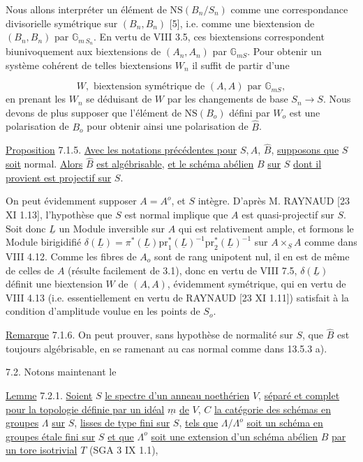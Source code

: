 Nous allons interpréter un élément de $\mathrm{NS}(B_n/S_n)$ comme une correspondance divisorielle symétrique sur $(B_n,B_n)$ [5], i.e. comme une biextension de $(B_n,B_n)$ par $\mathbb{G}_{m\,S_n}$. En vertu de VIII 3.5, ces biextensions correspondent biunivoquement aux biextensions de $(A_n,A_n)$ par $\mathbb{G}_{mS}$. Pour obtenir un système cohérent de telles biextensions $W_n$ il suffit de partir d'une

\begin{equation}\tag{7.1.4}
W, \text{ biextension symétrique de } (A,A) \text{ par } \mathbb{G}_{mS} ,
\end{equation}
en prenant les $W_n$ se déduisant de $W$ par les changements de base $S_n \longrightarrow S$. Nous devons de plus supposer que l'élément de $\mathrm{NS}(B_o)$ défini par $W_o$ est une polarisation de $B_o$ pour obtenir ainsi une polarisation de $\hat{B}$.



\underline{Proposition} 7.1.5. \underline{Avec les notations précédentes pour} $S,A$, $\hat{B}$, \underline{supposons que} $S$ \underline{soit} normal. \underline{Alors} $\hat{B}$ \underline{est algébrisable}, \underline{et le schéma abélien} $B$ \underline{sur} $S$ \underline{dont il provient est projectif sur} $S$.

On peut évidemment supposer $A=A^o$, et $S$ intègre. D'après M. RAYNAUD [23 XI 1.13], l'hypothèse que $S$ est normal implique que $A$ est quasi-projectif sur $S$. Soit donc $\underline{L}$ un Module inversible sur $A$ qui est relativement ample, et formons le Module birigidifié $\delta(\underline{L}) = \pi^*(\underline{L})\mathrm{pr}_1^*(\underline{L})^{-1}\mathrm{pr}_2^*(\underline{L})^{-1}$ sur $A\times_S A$ comme dans VIII 4.12. Comme les fibres de $A_o$ sont de rang unipotent nul, il en est de même de celles de $A$ (résulte facilement de 3.1), donc en vertu de VIII 7.5, $\delta(\underline{L})$ définit une biextension $W$ de $(A,A)$, évidemment symétrique, qui en vertu de VIII 4.13 (i.e. essentiellement en vertu de RAYNAUD [23 XI 1.11]) satisfait à la condition d'amplitude voulue en les points de $S_o$.

\underline{Remarque} 7.1.6. On peut prouver, sans hypothèse de normalité sur $S$, que $\hat{B}$ est toujours algébrisable, en se ramenant au cas normal comme dans 13.5.3 a).

7.2. Notons maintenant le

\underline{Lemme} 7.2.1. \underline{Soient} $S$ \underline{le spectre d'un anneau noethérien} $V$, \underline{séparé et complet pour la topologie définie par un idéal} $\underline{m}$ \underline{de} $V$, $C$ \underline{la catégorie des schémas en groupes} $\Lambda$ \underline{sur} $S$, \underline{lisses de type fini sur} $S$, \underline{tels que} $\Lambda/\Lambda^o$ \underline{soit un schéma en groupes étale fini sur} $S$ \underline{et que} $\Lambda^o$ \underline{soit une extension d'un schéma abélien} $B$ \underline{par un tore isotrivial} $T$ (SGA 3 IX 1.1),


